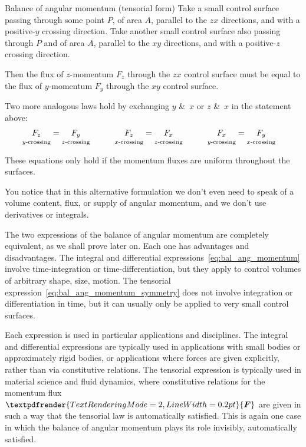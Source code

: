 \documentclass[a4paper,12pt,%
onecolumn,oneside,%
british%
]{memoir}
\newcommand*{\amp}{\&}
\renewcommand*{\bm}[1]{\textpdfrender{TextRenderingMode=2,LineWidth=0.2pt}{\boldsymbol{#1}}}
\renewcommand*{\|}[1][]{\nonscript\:#1\vert\nonscript\:\mathopen{}}
\newcommand*{\yF}{\bm{F}}
\begin{document}
\begin{definition}{Balance of angular momentum (tensorial form)}
  Take a small control surface passing through some point $P$, of area $A$, parallel to the $zx$ directions, and with a positive-$y$ crossing direction. Take another small control surface also passing through $P$ and of area $A$, parallel to the $xy$ directions, and with a positive-$z$ crossing direction.

  Then the flux of $z$-momentum $F_{z}$ through the $zx$ control surface must be equal to the flux of $y$-momentum $F_{y}$ through the $xy$ control surface.

  Two more analogous laws hold by exchanging $y$ \amp\ $x$ or $z$ \amp\ $x$ in the statement above:
  \begin{equation}
    \label{eq:bal_ang_momentum_symmetry}
    \begin{aligned}
      \underbracket[0pt]{\smash{F_{z}}}_{\text{$y$-crossing}}
      &=
      \underbracket[0pt]{\smash{F_{y}}}_{\text{$z$-crossing}}
&\qquad
      \underbracket[0pt]{\smash{F_{z}}}_{\text{$x$-crossing}}
      &=
      \underbracket[0pt]{\smash{F_{x}}}_{\text{$z$-crossing}}
&\qquad
      \underbracket[0pt]{\smash{F_{x}}}_{\text{$y$-crossing}}
      &=
      \underbracket[0pt]{\smash{F_{y}}}_{\text{$x$-crossing}}
    \end{aligned}
  \end{equation}

  These equations only hold if the momentum fluxes are uniform throughout the surfaces.
\end{definition}
You notice that in this alternative formulation we don't even need to speak of a volume content, flux, or supply of angular momentum, and we don't use derivatives or integrals.

The two expressions of the balance of angular momentum are completely equivalent, as we shall prove later on. Each one has advantages and disadvantages. The integral and differential expressions~\eqref{eq:bal_ang_momentum} involve time-integration or time-differentiation, but they apply to control volumes of arbitrary shape, size, motion. The tensorial expression~\eqref{eq:bal_ang_momentum_symmetry} does not involve integration or differentiation in time, but it can usually only be applied to very small control surfaces.

Each expression is used in particular applications and disciplines. The integral and differential expressions are typically used in applications with small bodies or approximately rigid bodies, or applications where forces are given explicitly, rather than via constitutive relations. The tensorial expression is typically used in material science and fluid dynamics, where constitutive relations for the momentum flux $\yF$ are given in such a way that the tensorial law is automatically satisfied. This is again one case in which the balance of angular momentum plays its role invisibly, automatically satisfied.
\end{document}
